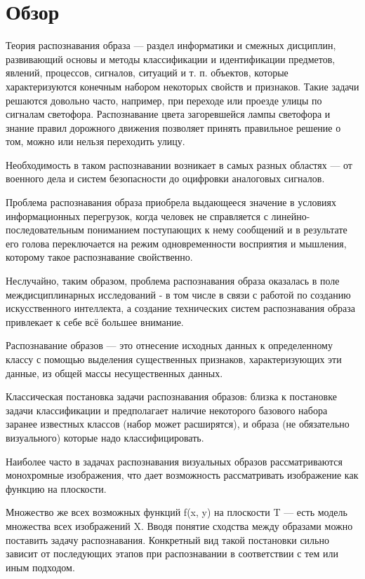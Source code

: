 \chapter{Обзор} \label{chapt2}
Теория распознавания образа — раздел информатики и смежных дисциплин, развивающий основы и методы классификации и идентификации предметов, явлений, процессов, сигналов, ситуаций и т. п. объектов, которые характеризуются конечным набором некоторых свойств и признаков. Такие задачи решаются довольно часто, например, при переходе или проезде улицы по сигналам светофора. Распознавание цвета загоревшейся лампы светофора и знание правил дорожного движения позволяет принять правильное решение о том, можно или нельзя переходить улицу.

Необходимость в таком распознавании возникает в самых разных областях — от военного дела и систем безопасности до оцифровки аналоговых сигналов.

Проблема распознавания образа приобрела выдающееся значение в условиях информационных перегрузок, когда человек не справляется с линейно-последовательным пониманием поступающих к нему сообщений и в результате его голова переключается на режим одновременности восприятия и мышления, которому такое распознавание свойственно.

Неслучайно, таким образом, проблема распознавания образа оказалась в поле междисциплинарных исследований - в том числе в связи с работой по созданию искусственного интеллекта, а создание технических систем распознавания образа привлекает к себе всё большее внимание.

Распознавание образов — это отнесение исходных данных к определенному классу с помощью выделения существенных признаков, характеризующих эти данные, из общей массы несущественных данных.

Классическая постановка задачи распознавания образов: близка к постановке задачи классификации и предполагает наличие некоторого базового набора заранее известных классов (набор может расширятся), и образа (не обязательно визуального) которые надо классифицировать.

Наиболее часто в задачах распознавания визуальных образов рассматриваются монохромные изображения, что дает возможность рассматривать изображение как функцию на плоскости.

Множество же всех возможных функций f(x, y) на плоскости T — есть модель множества всех изображений X. Вводя понятие сходства между образами можно поставить задачу распознавания. Конкретный вид такой постановки сильно зависит от последующих этапов при распознавании в соответствии с тем или иным подходом.

